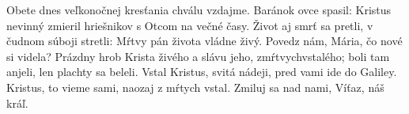 Obete dnes veľkonočnej 
kresťania chválu vzdajme. 
\versseparator
Baránok ovce spasil: 
Kristus nevinný zmieril 
hriešnikov s Otcom na večné časy. 
\versseparator
Život aj smrť sa pretli, 
v čudnom súboji stretli: 
Mŕtvy pán života vládne živý. 
\versseparator
Povedz nám, Mária, 
čo nové si videla? 
Prázdny hrob Krista živého 
a slávu jeho, zmŕtvychvstalého; 
\versseparator
boli tam anjeli, 
len plachty sa beleli. 
Vstal Kristus, svitá nádeji, 
pred vami ide do Galiley. 
\versseparator
Kristus, to vieme sami, 
naozaj z mŕtych vstal. 
Zmiluj sa nad nami, 
Víťaz, náš kráľ.